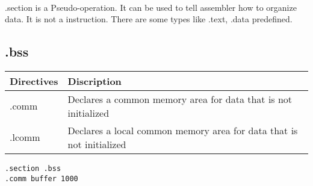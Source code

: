 \mbox{}\\


\colorbox[gray]{0.8}
{
	\parbox[t]{35em}
	{
		.section is a Pseudo-operation. It can be used to tell assembler how to organize data. It is not a instruction. There are some types like .text, .data predefined.
	}
}


\subsection{.bss}
\begin{tabular}[c]{l|l}
    \hline
        Directives & Discription\\
    \hline
        .comm & Declares a common memory area for data that is not initialized\\
        .lcomm & Declares a local common memory area for data that is not initialized\\
    \hline
\end{tabular}
\begin{lstlisting}
.section .bss
.comm buffer 1000
\end{lstlisting}



